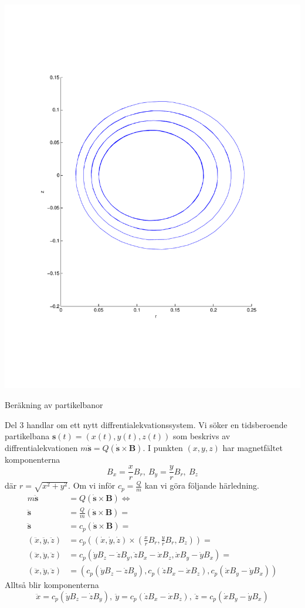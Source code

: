 \documentclass[a4paper]{article}
\begin{document}
\includegraphics[scale=0.5]{ovals.pdf}

\clearpage
\centerline{\sc Beräkning av partikelbanor}
\vspace{2pc}

Del 3 handlar om ett nytt diffrentialekvationssystem. Vi söker en tidsberoende
partikelbana $\mathbf{s}(t) = (x(t), y(t), z(t))$ som beskrivs av
diffrentialekvationen $m\mathbf{\ddot{s}} = Q(\mathbf{\dot{s}} \times
\mathbf{B})$. I punkten $(x, y, z)$ har magnetfältet komponenterna
$$
B_x = \frac{x}{r}B_r,\ B_y = \frac{y}{r}B_r,\ B_z
$$
där $r = \sqrt{x^2 + y^2}$. Om vi inför $c_p = \frac{Q}{m}$ kan vi göra följande
härledning.
\begin{eqnarray*}
  m\mathbf{\ddot{s}} & = Q(\mathbf{\dot{s}} \times \mathbf{B}) \Leftrightarrow
  \\
  \mathbf{\ddot{s}} & = \frac{Q}{m}(\mathbf{\dot{s}} \times \mathbf{B}) = 
  \\
  \mathbf{\ddot{s}} & = c_p(\mathbf{\dot{s}} \times \mathbf{B}) = 
  \\
  (\ddot{x}, \ddot{y}, \ddot{z})& = c_p((\dot{x},\dot{y},\dot{z}) \times
  (\frac{x}{r}B_r,\frac{y}{r}B_r,B_z)) = 
  \\
  (\ddot{x}, \ddot{y}, \ddot{z})& = c_p(\dot{y}B_z - \dot{z}B_y, 
  \dot{z}B_x - \dot{x}B_z, \dot{x}B_y - \dot{y}B_x) = 
  \\
  (\ddot{x}, \ddot{y}, \ddot{z})& = (c_p(\dot{y}B_z - \dot{z}B_y), 
  c_p(\dot{z}B_x - \dot{x}B_z), c_p(\dot{x}B_y - \dot{y}B_x))
\end{eqnarray*}
Alltså blir komponenterna 
$$
\ddot{x} = c_p(\dot{y}B_z - \dot{z}B_y),\ \ddot{y} = c_p(\dot{z}B_x -
\dot{x}B_z),\ \ddot{z} = c_p(\dot{x}B_y - \dot{y}B_x)
$$
\end{document}
